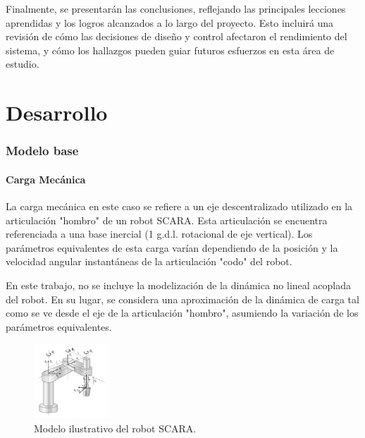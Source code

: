\documentclass{article}
\begin{document}
Finalmente, se presentarán las conclusiones, reflejando las principales lecciones aprendidas y los logros alcanzados a lo 
largo del proyecto. Esto incluirá una revisión de cómo las decisiones de diseño y control afectaron el rendimiento del 
sistema, y cómo los hallazgos pueden guiar futuros esfuerzos en esta área de estudio.

\newpage

\part*{Desarrollo}


\section{Modelo base}

\subsection{Carga Mecánica}
    
    La carga mecánica en este caso se refiere a un eje descentralizado utilizado en la articulación "hombro" 
    de un robot SCARA. Esta articulación se encuentra referenciada a una base inercial (1 g.d.l.
    rotacional de eje vertical). Los parámetros equivalentes de esta carga varían dependiendo de la posición 
    y la velocidad angular instantáneas de la articulación "codo" del robot.

    En este trabajo, no se incluye la modelización de la dinámica no lineal acoplada del robot. En su lugar, 
    se considera una aproximación de la dinámica de carga tal como se ve desde el eje de la articulación 
    "hombro", asumiendo la variación de los parámetros equivalentes.

    \begin{figure}[H]
        \centering
        \includegraphics[width=0.25\textwidth]{Alan1.jpg}
        \caption{Modelo ilustrativo del robot SCARA.}
    \end{figure}
\end{document}
